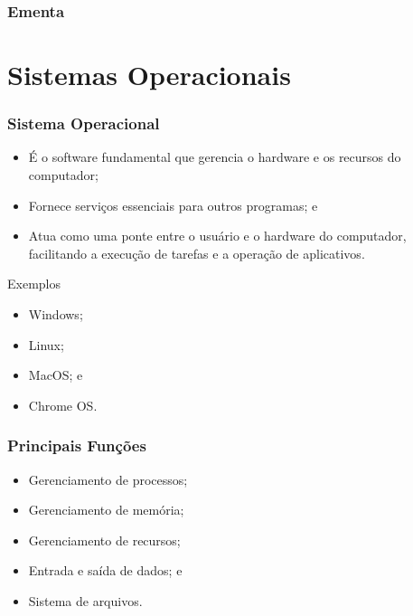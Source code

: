 \documentclass[aspectratio=169]{beamer} %
\begin{document}
\begin{frame}
	\frametitle{Ementa}
  	\tableofcontents
\end{frame}


\section{Sistemas Operacionais}

\begin{frame}
	\frametitle{Sistema Operacional}
	
	\begin{itemize} 
		\item É o software fundamental que gerencia o hardware e os recursos do computador;
		\item Fornece serviços essenciais para outros programas; e
		\item Atua como uma ponte entre o usuário e o hardware do computador, facilitando a execução de tarefas e a operação de aplicativos.
	\end{itemize}\vfill
	
	\begin{exampleblock}{Exemplos}
		\begin{itemize}
			\item Windows;
			\item Linux;
			\item MacOS; e
			\item Chrome OS.
		\end{itemize}
	\end{exampleblock}
\end{frame}

\begin{frame}
	\frametitle{Principais Funções}
	
	\begin{itemize}
		\item Gerenciamento de processos;
		\item Gerenciamento de memória;
		\item Gerenciamento de recursos;
		\item Entrada e saída de dados; e
		\item Sistema de arquivos.
	\end{itemize}
\end{frame}
\end{document}
